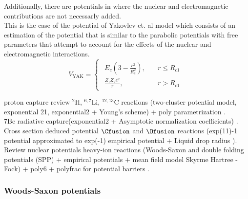 \documentclass[openany]{book}
\begin{document}
Additionally, there are potentials in where the nuclear and electromagnetic contributions are not necessarly added. \\

This is the case of the potential of Yakovlev et. al model \cite{yakovlev_beard_gasques_wiescher_2010} which consists of an estimation of the potential that is similar to the parabolic potentials with free parameters that attempt to account for the effects of the nuclear and electromagnetic interactions.  \\

\begin{equation} \label{eq:potential_Yakovlev}
	V_{\mathrm{YAK}} = 	\left\{\begin{array}{l}
		\begin{split}
			E_c\left(3 - \frac{r^2}{R_c^2}\right), \quad &r \le R_{c1} \\ 
			\frac{Z_1Z_2e^2}{r}, \quad &r > R_{c1}	
		\end{split}
	\end{array}\right.
\end{equation}


proton capture review $\mathrm{{}^{2}H}$, $\mathrm{{}^{6,7}Li}$, $\mathrm{^{12, 13}C}$ reactions (two-cluster potential model, exponential 21, exponential2 + Young's scheme) + poly parametrization \cite{dubovichenko_dzhazairov-kakhramanov_2012}. \\

7Be radiative capture(exponential2 + Asymptotic normalization coefficients) \cite{tursunov_turakulov_kadyrov_blokhintsev_2021}. \\

Cross section deduced potential  $\Cfusion$ and $\Ofusion$ reactions (exp(11)-1 potential approximated to exp(-1) empirical potential + Liquid drop radius )\cite{bass_1977}. \\

Review nuclear potentials heavy-ion reactions (Woods-Saxon and double folding potentials (SPP) + empirical potentials  + mean field model Skyrme Hartree - Fock) + poly6 + polyfrac for potential barriers \cite{nandi_swami_gupta_kumar_chakraborty_manjunatha_2022}. \\

\subsubsection{Woods-Saxon potentials} \label{sub:potential_effective_woodsSaxon}
\end{document}
